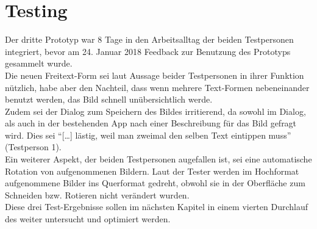 \section{Testing}\label{sec:test3}
Der dritte Prototyp war 8 Tage in den Arbeitsalltag der beiden Testpersonen integriert, bevor am 24. Januar 2018 Feedback zur Benutzung des Prototyps gesammelt wurde. \\

Die neuen Freitext-Form sei laut Aussage beider Testpersonen in ihrer Funktion nützlich, habe aber den Nachteil, dass wenn mehrere Text-Formen nebeneinander benutzt werden, das Bild schnell unübersichtlich werde. \\

Zudem sei der Dialog zum Speichern des Bildes irritierend, da sowohl im Dialog, als auch in der bestehenden App nach einer Beschreibung für das Bild gefragt wird.
Dies sei ``[\dots] lästig, weil man zweimal den selben Text eintippen muss'' (Testperson 1). \\

Ein weiterer Aspekt, der beiden Testpersonen augefallen ist, sei eine automatische Rotation von aufgenommenen Bildern.
Laut der Tester werden im Hochformat aufgenommene Bilder ins Querformat gedreht, obwohl sie in der Oberfläche zum Schneiden bzw. Rotieren nicht verändert wurden. \\

Diese drei Test-Ergebnisse sollen im nächsten Kapitel in einem vierten Durchlauf des \hcdp{} weiter untersucht und optimiert werden.
